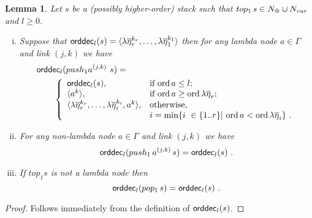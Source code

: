 \documentclass[a4paper]{article}[12pt]
\newtheorem{lemma}{Lemma}[section]
\theoremstyle{remark}
\theoremstyle{definition}
\newcommand\orddec{{\sf orddec}}
\newcommand\Nodes{N}%
\begin{document}
\begin{lemma}
\label{lem:push1pop1_orderdecompo} Let $s$ be a (possibly higher-order) stack
such that $top_1\,s \in \Nodes_@ \union \Nodes_{var}$ and $l\geq 0$.
\begin{enumerate}[(i)]
\item Suppose that $\orddec_l(s) = \langle \lambda
\overline{\eta}_r^{k_r}, \ldots, \lambda \overline{\eta}_1^{k_1}
\rangle$ then for any lambda node $a \in \Gamma$ and link $(j,k)$ we have
 \begin{align*} &\orddec_l(push_1 a^{(j,k)}~s) = \\
&                 \qquad \left\{
                                       \begin{array}{ll}
\orddec_l(s), &\hbox{if $\ord{a}\leq l$;} \\
                                        \langle a^k \rangle, &  \hbox{if $\ord{a} \geq \ord{\lambda \overline{\eta}_r}$}; \\
                                         \langle \lambda \overline{\eta}_r^{k_r}, \ldots, \lambda
\overline{\eta}_i^{k_i}, a^k \rangle,
&                                        \mbox{otherwise,} \\
&                              i = \min \{ i \ \in \{1..r\}| \, \ord{a} <
\ord{\lambda \overline{\eta}_i} \}\ .
\\
                                       \end{array}
                                     \right.
\end{align*}
\item For any non-lambda node $a \in \Gamma$ and link $(j,k)$ we have
$$ \orddec_l(push_1\,a^{(j,k)}\,s) = \orddec_l(s) \ .$$

\item If $top_1 s$ is not a lambda node then
$$ \orddec_l(pop_1\,s) = \orddec_l(s) \ .$$
\end{enumerate}
\end{lemma}
\begin{proof}
Follows immediately from the definition of  $\orddec_l(s)$.
\end{proof}
\end{document}
